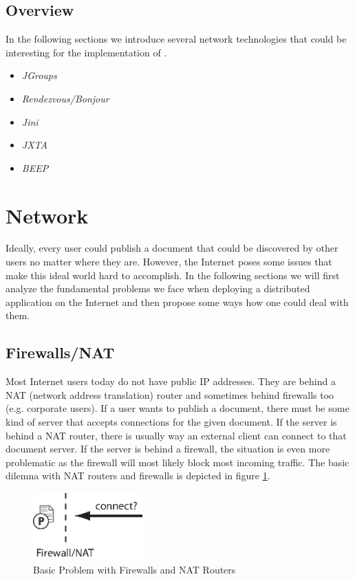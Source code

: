 \documentclass[11pt,a4paper]{article}
\begin{document}
\subsection{Overview}
In the following sections we introduce several network technologies that could be interesting for the implementation of \ace. 

\begin{itemize}
 \item \emph{JGroups}
 \item \emph{Rendezvous/Bonjour}
 \item \emph{Jini}
 \item \emph{JXTA}
 \item \emph{BEEP}
\end{itemize}


\section{Network}
Ideally, every user could publish a document that could be discovered by other users no matter where they are. However, the Internet poses some issues that make this ideal world hard to accomplish. In the following sections we will first analyze the fundamental problems we face when deploying a distributed application on the Internet and then propose some ways how one could deal with them.

\subsection{Firewalls/NAT}
Most Internet users today do not have public IP addresses. They are behind a NAT (network address translation) router and sometimes behind firewalls too (e.g. corporate users). If a user wants to publish a document, there must be some kind of server that accepts connections for the given document. If the server is behind a NAT router, there is usually way an external client can connect to that document server. If the server is behind a firewall, the situation is even more problematic as the firewall will most likely block most incoming traffic. The basic dilemna with NAT routers and firewalls is depicted in figure \ref{fig:firewall}.

\begin{figure}[H]
 \centering
 \includegraphics[width=4.2cm,height=2.6cm]{../../images/net_firewall.eps}
 \caption{Basic Problem with Firewalls and NAT Routers}
 \label{fig:firewall}
\end{figure}
\end{document}

